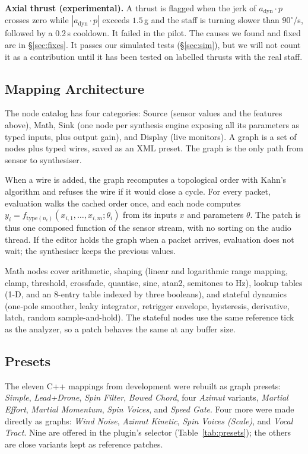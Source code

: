 \documentclass[sigconf,nonacm]{acmart}
\newcommand{\preset}[1]{\textit{#1}}
\begin{document}
\textbf{Axial thrust (experimental).} A thrust is flagged when the jerk of $a_{\text{dyn}}\cdot p$
crosses zero while $|a_{\text{dyn}}\cdot p|$ exceeds $1.5$\,g and the staff is turning slower than
$90^\circ$/s, followed by a 0.2\,s cooldown. It failed in the pilot. The causes we found and fixed
are in \S\ref{sec:fixes}. It passes our simulated tests (\S\ref{sec:sim}), but we will not count it as
a contribution until it has been tested on labelled thrusts with the real staff.

\subsection{Mapping Architecture}
\label{sec:mapping-arch}
The node catalog has four categories: Source (sensor values and the features above), Math, Sink
(one node per synthesis engine exposing all its parameters as typed inputs, plus output gain), and
Display (live monitors). A graph is a set of nodes plus typed wires, saved as an XML preset. The
graph is the only path from sensor to synthesiser.

When a wire is added, the graph recomputes a topological order with Kahn's algorithm and refuses
the wire if it would close a cycle. For every packet, evaluation walks the cached order once, and
each node computes $y_i = f_{\text{type}(n_i)}(x_{i,1},\dots,x_{i,m};\theta_i)$ from its inputs $x$
and parameters $\theta$. The patch is thus one composed function of the sensor stream, with no
sorting on the audio thread. If the editor holds the graph when a packet arrives, evaluation does not
wait; the synthesiser keeps the previous values.

Math nodes cover arithmetic, shaping (linear and logarithmic range mapping, clamp, threshold,
crossfade, quantise, sine, atan2, semitones to Hz), lookup tables (1-D, and an 8-entry table indexed
by three booleans), and stateful dynamics (one-pole smoother, leaky integrator, retrigger envelope,
hysteresis, derivative, latch, random sample-and-hold). The stateful nodes use the same reference
tick as the analyzer, so a patch behaves the same at any buffer size.

\subsection{Presets}
\label{sec:named-mappings}
The eleven C++ mappings from development were rebuilt as graph presets: \preset{Simple},
\preset{Lead+Drone}, \preset{Spin Filter}, \preset{Bowed Chord}, four \preset{Azimut} variants,
\preset{Martial Effort}, \preset{Martial Momentum}, \preset{Spin Voices}, and \preset{Speed Gate}.
Four more were made directly as graphs: \preset{Wind Noise}, \preset{Azimut Kinetic}, \preset{Spin
Voices (Scale)}, and \preset{Vocal Tract}. Nine are offered in the plugin's selector
(Table~\ref{tab:presets}); the others are close variants kept as reference patches.
\end{document}
